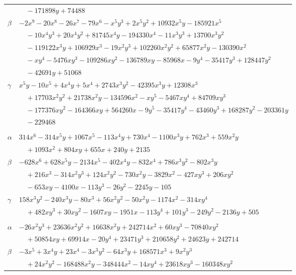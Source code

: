 \documentclass[11pt]{article}
\begin{document}
\begin{longtable}{@{}ll@{}}
 & $\quad -171898y+74488$\\
$\beta$ & $-2x^{9}-20x^{8}-26x^{7}-79x^{6}-x^{5}y^{3}+2x^{5}y^{2}+10932x^{5}y-185921x^{5}$\\
 & $\quad -10x^{4}y^{3}+20x^{4}y^{2}+81745x^{4}y-194330x^{4}-11x^{3}y^{3}+13700x^{3}y^{2}$\\
 & $\quad -119122x^{3}y+106929x^{3}-19x^{2}y^{3}+102260x^{2}y^{2}+65877x^{2}y-130390x^{2}$\\
 & $\quad -xy^{4}-5476xy^{3}-109286xy^{2}-136789xy-85968x-9y^{4}-35417y^{3}+128447y^{2}$\\
 & $\quad -42691y+51068$\\
$\gamma$ & $x^{5}y-10x^{5}+4x^{4}y+5x^{4}+2743x^{3}y^{2}-42395x^{3}y+12308x^{3}$\\
 & $\quad +17703x^{2}y^{2}+21738x^{2}y-134596x^{2}-xy^{5}-5467xy^{4}+84709xy^{3}$\\
 & $\quad -177376xy^{2}-164366xy+564260x-9y^{5}-35417y^{4}-43460y^{3}+168287y^{2}-203361y$\\
 & $\quad -229468$\\
\addlinespace[3pt]
\multicolumn{2}{@{}l}{$\{i,j\}=\{23,157\}$, $k_{ij}=2^{2}\cdot 3^{2}\cdot 5^{2}\cdot 7$}\\
$\alpha$ & $314x^{6}-314x^{5}y+1067x^{5}-113x^{4}y+730x^{4}-1100x^{3}y+762x^{3}+559x^{2}y$\\
 & $\quad +1093x^{2}+804xy+655x+240y+2135$\\
$\beta$ & $-628x^{6}+628x^{5}y-2134x^{5}-402x^{4}y-832x^{4}+786x^{3}y^{2}-802x^{3}y$\\
 & $\quad +216x^{3}-314x^{2}y^{3}+124x^{2}y^{2}-730x^{2}y-3829x^{2}-427xy^{3}+206xy^{2}$\\
 & $\quad -653xy-4100x-113y^{3}-26y^{2}-2245y-105$\\
$\gamma$ & $158x^{3}y^{2}-240x^{3}y-80x^{3}+56x^{2}y^{2}-50x^{2}y-1174x^{2}-314xy^{4}$\\
 & $\quad +482xy^{3}+30xy^{2}-1607xy-1951x-113y^{4}+101y^{3}-249y^{2}-2136y+505$\\
\addlinespace[3pt]
\multicolumn{2}{@{}l}{$\{i,j\}=\{23,158\}$, $k_{ij}=2^{8}\cdot 3^{4}\cdot 5^{2}$}\\
$\alpha$ & $-26x^{2}y^{3}+23636x^{2}y^{2}+16638x^{2}y+242714x^{2}+60xy^{3}-70840xy^{2}$\\
 & $\quad +50854xy+69914x-20y^{4}+23471y^{3}+210658y^{2}+24623y+242714$\\
$\beta$ & $-3x^{5}+3x^{4}y+23x^{4}-3x^{3}y^{2}-64x^{3}y+168571x^{3}+9x^{2}y^{3}$\\
 & $\quad +24x^{2}y^{2}-168488x^{2}y-348444x^{2}-14xy^{4}+23618xy^{3}-160348xy^{2}$\\

\end{longtable}
\end{document}
